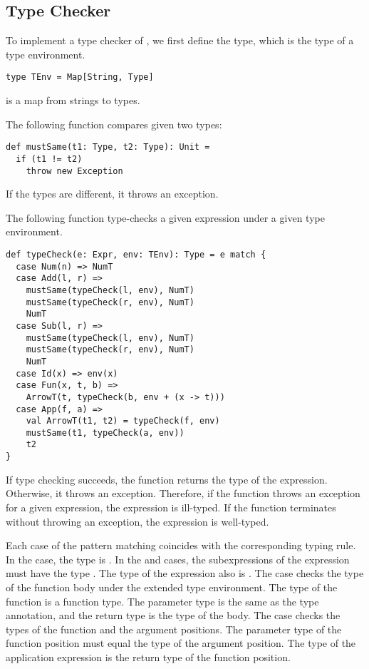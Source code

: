 \subsection{Type Checker}

To implement a type checker of \Lang, we first define the  type,
which is the type of a type environment.

\begin{verbatim}
type TEnv = Map[String, Type]
\end{verbatim}

 is a map from strings to \Lang types.

The following  function compares given two types:

\begin{verbatim}
def mustSame(t1: Type, t2: Type): Unit =
  if (t1 != t2)
    throw new Exception
\end{verbatim}

If the types are different, it throws an exception.

The following  function type-checks a given expression under a
given type environment.

\begin{verbatim}
def typeCheck(e: Expr, env: TEnv): Type = e match {
  case Num(n) => NumT
  case Add(l, r) =>
    mustSame(typeCheck(l, env), NumT)
    mustSame(typeCheck(r, env), NumT)
    NumT
  case Sub(l, r) =>
    mustSame(typeCheck(l, env), NumT)
    mustSame(typeCheck(r, env), NumT)
    NumT
  case Id(x) => env(x)
  case Fun(x, t, b) =>
    ArrowT(t, typeCheck(b, env + (x -> t)))
  case App(f, a) =>
    val ArrowT(t1, t2) = typeCheck(f, env)
    mustSame(t1, typeCheck(a, env))
    t2
}
\end{verbatim}

If type checking succeeds,
the function returns the type of the expression. Otherwise, it throws an exception.
Therefore, if the function throws an exception for a given expression, the
expression is ill-typed. If the function terminates without throwing an
exception, the expression is well-typed.

Each case of the pattern matching coincides with the corresponding typing rule. In the
 case, the type is . In the  and  cases,
the subexpressions of the expression must have the type . The type of
the expression also is . The  case checks the type of the
function body under the extended type environment. The type of the function is
a function type. The parameter type is the same as the type annotation, and the
return type is the type of the body. The  case
checks the types of the function and the argument positions. The parameter type of the
function position must equal the type of the argument position.
The type of the application expression
is the return type of the function position.


